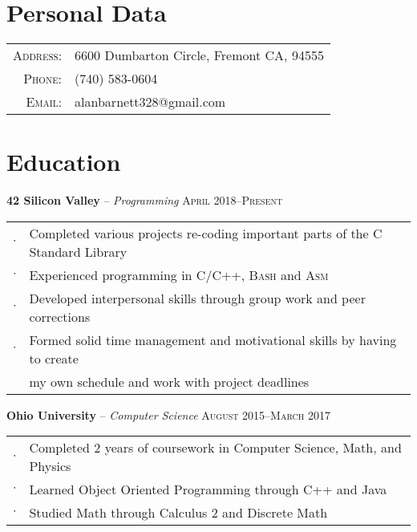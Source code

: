 \documentclass[letterpaper,12pt]{article}
\begin{document}
\pagestyle{empty} %

\par{\bigskip\par}

\section{Personal Data}

\begin{tabular}{rl}
\textsc{Address:} & 6600 Dumbarton Circle, Fremont CA, 94555 \\
\textsc{Phone:} & (740) 583-0604 \\
\textsc{Email:} & alanbarnett328@gmail.com
\end{tabular}

\section{Education}

\textbf{42 Silicon Valley} -- \textit{Programming} \hfill \textsc{April 2018--Present}

\begin{tabular}{rl}
$\cdot$ & Completed various projects re-coding important parts of the C Standard Library \\
$\cdot$ & Experienced programming in \textsc{C/C++, Bash} and \textsc{Asm} \\
$\cdot$ & Developed interpersonal skills through group work and peer corrections \\
$\cdot$ & Formed solid time management and motivational skills by having to create \\
		& my own schedule and work with project deadlines \\
\end{tabular}


\textbf{Ohio University} -- \textit{Computer Science} \hfill \textsc{August 2015--March 2017}

\begin{tabular}{rl}
$\cdot$ & Completed 2 years of coursework in Computer Science, Math, and Physics \\
$\cdot$ & Learned Object Oriented Programming through C++ and Java \\
$\cdot$ & Studied Math through Calculus 2 and Discrete Math \\
\end{tabular}
\end{document}
